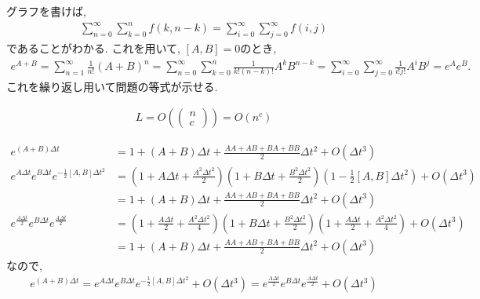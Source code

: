\begin{ex}
    \label{ex4.47}
    グラフを書けば,
    \begin{align*}
        \sum_{n=0}^\infty \sum_{k=0}^{n} f(k, n-k)=  \sum_{i=0}^\infty \sum_{j=0}^{\infty} f(i,j)
    \end{align*}
    であることがわかる. これを用いて,
    $[A,B] = 0$のとき,
    \begin{align*}
        e^{A+B} = \sum_{n=1}^\infty \frac{1}{n !}\left( A+B \right)^n
        = \sum_{n=0}^\infty \sum_{k=0}^{n} \frac{1}{k! (n-k)!} A^k B^{n-k}
        = \sum_{i=0}^\infty \sum_{j=0}^{\infty} \frac{1}{i! j!} A^i B^{j}
        = e^A e^B.
    \end{align*}
    これを繰り返し用いて問題の等式が示せる.
\end{ex}

\begin{ex}
    \label{ex4.48}
    \begin{align*}
        L = O \left(
        \begin{pmatrix}
            n \\ c
        \end{pmatrix}
        \right) = O(n^c)
    \end{align*}
\end{ex}

\begin{ex}
    \label{ex4.49}
    \begin{align*}
        e^{(A+B)\Delta t}
         & = 1 + \left(A + B\right) \Delta t + \frac{AA + AB + BA + BB}{2}\Delta t^2 + O\left( \Delta t^3\right)                                                                          \\
        e^{A \Delta t} e^{B \Delta t} e^{- \frac{1}{2} [A,B] \Delta t^2}
         & = \left( 1 + A \Delta t + \frac{A^2 \Delta t^2}{2}\right) \left( 1 + B \Delta t+ \frac{B^2 \Delta t^2}{2}\right)\left( 1 - \frac{1}{2} [A,B] \Delta t^2\right) + O(\Delta t^3) \\
         & = 1 + \left(A + B\right) \Delta t +\frac{AA + AB + BA + BB}{2}\Delta t^2 + O\left( \Delta t^3\right)                                                                           \\
        e^{ \frac{A \Delta t}{2} } e^{B \Delta t}e^{ \frac{A \Delta t}{2} }
         & =
        \left( 1 + \frac{A \Delta t}{2} + \frac{A^2 \Delta t^2}{4}\right)
        \left( 1 + B \Delta t + \frac{B^2 \Delta t^2}{2}\right)
        \left( 1 + \frac{A \Delta t}{2} + \frac{A^2 \Delta t^2}{4}\right)                                       + O\left( \Delta t^3\right)                                               \\
         & = 1 + \left(A + B\right) \Delta t + \frac{AA + AB + BA + BB}{2}\Delta t^2 + O\left( \Delta t^3\right)
    \end{align*}
    なので,
    \begin{align*}
        e^{(A+B)\Delta t} =e^{A \Delta t} e^{B \Delta t} e^{- \frac{1}{2} [A,B] \Delta t^2} + O\left( \Delta t^3\right) = e^{ \frac{A \Delta t}{2} } e^{B \Delta t}e^{ \frac{A \Delta t}{2} } + O\left( \Delta t^3\right)
    \end{align*}
\end{ex}

